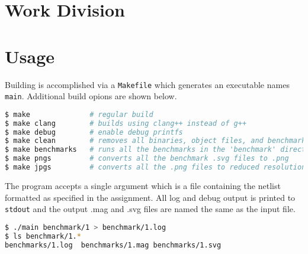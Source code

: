 \documentclass[10pt]{article}
\begin{document}
\section{Work Division}




\newpage
\section{Usage}

Building is accomplished via a \texttt{Makefile} which generates an executable
names \texttt{main}. Additional build opions are shown below.

\begin{lstlisting}[language=bash]
$ make              # regular build
$ make clang        # builds using clang++ instead of g++
$ make debug        # enable debug printfs
$ make clean        # removes all binaries, object files, and benchmark results
$ make benchmarks   # runs all the benchmarks in the 'benchmark' directory
$ make pngs         # converts all the benchmark .svg files to .png
$ make jpgs         # converts all the .png files to reduced resolution .jpg files
\end{lstlisting}

The program accepts a single argument which is a file containing the netlist
formatted as specified in the assignment. All log and debug output is printed
to \texttt{stdout} and the output .mag and .svg files are named the same as the
input file.

\begin{lstlisting}[language=bash]
$ ./main benchmark/1 > benchmark/1.log
$ ls benchmark/1.*
benchmarks/1.log  benchmarks/1.mag benchmarks/1.svg
\end{lstlisting}
\end{document}
